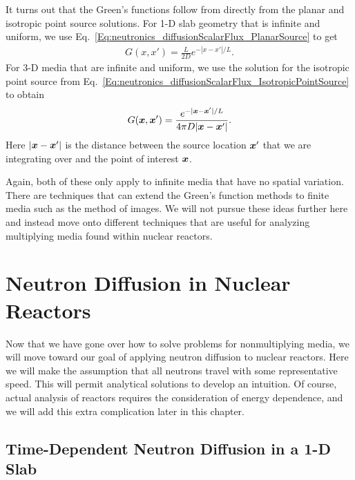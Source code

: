 It turns out that the Green's functions follow from directly from the planar and isotropic point source solutions. For 1-D slab geometry that is infinite and uniform, we use Eq.~\eqref{Eq:neutronics_diffusionScalarFlux_PlanarSource} to get
\begin{align} \label{Eq:neutronics_diffusionGreensFunction_PlanarSource}
  G(x,x') = \frac{ L }{ 2 D } e^{-|x-x'|/L} .
\end{align}
For 3-D media that are infinite and uniform, we use the solution for the isotropic point source from Eq.~\eqref{Eq:neutronics_diffusionScalarFlux_IsotropicPointSource} to obtain
\begin{align} \label{Eq:neutronics_diffusionGreensFunction_IsotropicPointSource}
  G(\bm{x},\bm{x}')  = \frac{ e^{-|\bm{x} - \bm{x}'|/L}  }{ 4 \pi D |\bm{x} - \bm{x}'| }  .
\end{align}
Here $| \bm{x} - \bm{x}' |$ is the distance between the source location $\bm{x}'$ that we are integrating over and the point of interest $\bm{x}$.

Again, both of these only apply to infinite media that have no spatial variation. There are techniques that can extend the Green's function methods to finite media such as the method of images. We will not pursue these ideas further here and instead move onto different techniques that are useful for analyzing multiplying media found within nuclear reactors.

\section{Neutron Diffusion in Nuclear Reactors}

Now that we have gone over how to solve problems for nonmultiplying media, we will move toward our goal of applying neutron diffusion to nuclear reactors. Here we will make the assumption that all neutrons travel with some representative speed. This will permit analytical solutions to develop an intuition. Of course, actual analysis of reactors requires the consideration of energy dependence, and we will add this extra complication later in this chapter.

\subsection{Time-Dependent Neutron Diffusion in a 1-D Slab} \label{Sec:neutronics_timeDependentDiffusion_1DSlab}

